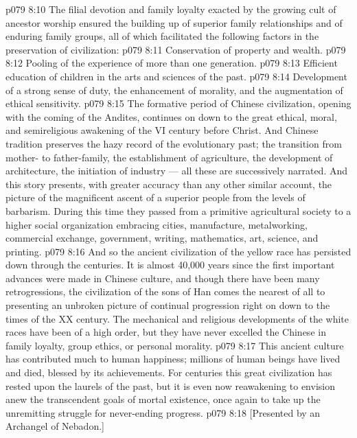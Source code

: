 \vs p079 8:10 The filial devotion and family loyalty exacted by the growing cult of ancestor worship ensured the building up of superior family relationships and of enduring family groups, all of which facilitated the following factors in the preservation of civilization:
\vs p079 8:11 \bibnobreakspace Conservation of property and wealth.
\vs p079 8:12 \bibnobreakspace Pooling of the experience of more than one generation.
\vs p079 8:13 \bibnobreakspace Efficient education of children in the arts and sciences of the past.
\vs p079 8:14 \bibnobreakspace Development of a strong sense of duty, the enhancement of morality, and the augmentation of ethical sensitivity.
\vs p079 8:15 \pc The formative period of Chinese civilization, opening with the coming of the Andites, continues on down to the great ethical, moral, and semireligious awakening of the VI century before Christ. And Chinese tradition preserves the hazy record of the evolutionary past; the transition from mother\hyp{} to father\hyp{}family, the establishment of agriculture, the development of architecture, the initiation of industry --- all these are successively narrated. And this story presents, with greater accuracy than any other similar account, the picture of the magnificent ascent of a superior people from the levels of barbarism. During this time they passed from a primitive agricultural society to a higher social organization embracing cities, manufacture, metalworking, commercial exchange, government, writing, mathematics, art, science, and printing.
\vs p079 8:16 And so the ancient civilization of the yellow race has persisted down through the centuries. It is almost 40,000 years since the first important advances were made in Chinese culture, and though there have been many retrogressions, the civilization of the sons of Han comes the nearest of all to presenting an unbroken picture of continual progression right on down to the times of the XX century. The mechanical and religious developments of the white races have been of a high order, but they have never excelled the Chinese in family loyalty, group ethics, or personal morality.
\vs p079 8:17 This ancient culture has contributed much to human happiness; millions of human beings have lived and died, blessed by its achievements. For centuries this great civilization has rested upon the laurels of the past, but it is even now reawakening to envision anew the transcendent goals of mortal existence, once again to take up the unremitting struggle for never\hyp{}ending progress.
\vsetoff
\vs p079 8:18 [Presented by an Archangel of Nebadon.]
\quizlink
